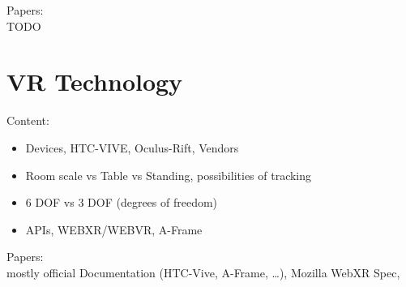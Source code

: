 Papers:\\
TODO

\section{VR Technology}

Content:
\begin{itemize}
    \item Devices, HTC-VIVE, Oculus-Rift, Vendors
    \item Room scale vs Table vs Standing, possibilities of tracking
    \item 6 DOF vs 3 DOF (degrees of freedom)
    \item APIs, WEBXR/WEBVR, A-Frame 
\end{itemize}

Papers:\\
mostly official Documentation (HTC-Vive, A-Frame, \dots ), Mozilla WebXR Spec, 

